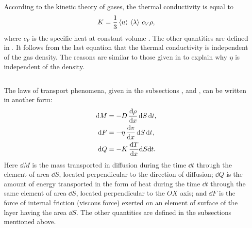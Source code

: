 According to the kinetic theory of gases, the thermal conduc­tivity is equal to
\begin{equation*}%
K = \frac{1}{3} \expval{u}\, \expval{\lambda} \, c_{V} \rho,
\end{equation*}
where $c_{V}$ is the specific heat at constant volume . The other quantities are defined in . It follows from the last equation that the thermal conductivity is inde­pendent of the gas density. The reasons are similar to those given in  to explain why $\eta$ is independent of the density.

\subsection{}\label{10.8.6} The laws of transport phenomena, given in the subsec­tions ,  and , can be written in another form:
\begin{align*}%
\dd M & = - D \,\dv{\rho}{x}\, \dd S \,\dd t,\\
\dd F & = - \eta \,\dv{v}{x}\, \dd S \,\dd t,\\
\dd Q & = - K \,\dv{T}{x} \dd S \dd t.
\end{align*}
Here $\dd M$ is the mass transported in diffusion during the time $\dd t$ through the element of area $\dd S$, located perpendicular to the direction of diffusion; $\dd Q$ is the amount of energy transported in the form of heat during the time $\dd t$ through the same element of area $\dd S$, located perpendicular to the $OX$ axis; and $\dd F$ is the force of internal friction (viscous force) exerted on an ele­ment of surface of the layer having the area $\dd S$. The other quantities are defined in the subsections mentioned above.

